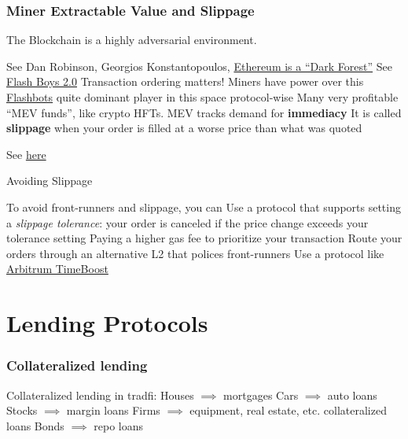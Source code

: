 \documentclass[]{beamer}
\begin{document}
\begin{frame}
\frametitle{Miner Extractable Value and Slippage}

The Blockchain is a highly adversarial environment. 

\bi
\m See Dan Robinson, Georgios Konstantopoulos, \href{https://www.paradigm.xyz/2020/08/ethereum-is-a-dark-forest}{Ethereum is a ``Dark Forest''}
\m See \href{https://arxiv.org/abs/1904.05234}{Flash Boys 2.0}
\m Transaction ordering matters! Miners have power over this
\m \href{https://docs.flashbots.net/}{Flashbots} quite dominant player in this space protocol-wise
\m Many very profitable ``MEV funds'', like crypto HFTs. 
\m MEV tracks demand for \textbf{immediacy} \pause 
\m It is called \textbf{slippage} when your order is filled at a worse price than what was quoted 
\ei

\vspace{2ex}
See \href{https://twitter.com/AnthonyLeeZhang/status/1579181323637641217}{here}

\end{frame}

\begin{frame}{Avoiding Slippage}

To avoid front-runners and slippage, you can 
\bi 
\m Use a protocol that supports setting a \emph{slippage tolerance}: your order is canceled if the price change exceeds your tolerance setting 
\m Paying a higher gas fee to prioritize your transaction 
\m Route your orders through an alternative L2 that polices front-runners
\m Use a protocol like \href{https://docs.arbitrum.io/how-arbitrum-works/timeboost/gentle-introduction}{Arbitrum TimeBoost}
\ei 
    
\end{frame}


\section{Lending Protocols}

\begin{frame}
\frametitle{Collateralized lending}

Collateralized lending in tradfi:
\bi
\m Houses $\implies$ mortgages
\m Cars $\implies$ auto loans
\m Stocks $\implies$ margin loans
\m Firms $\implies$ equipment, real estate, etc. collateralized loans
\m Bonds $\implies$ repo loans
\ei

\end{frame}
\end{document}
